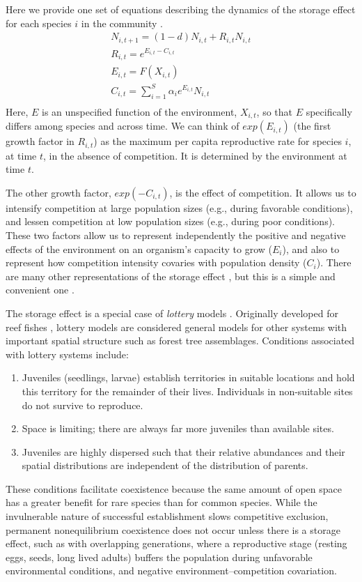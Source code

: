 Here we provide one set of equations describing the dynamics of the storage effect for each species $i$ in the community \cite{Chesson:1994pb}.
\begin{gather}
  \label{eq:storage}
  N_{i,t+1} = \left(1-d\right)N_{i,t} + R_{i,t}N_{i,t} \\
  R_{i,t} = e^{E_{i,t} - C_{i,t}} \\
  E_{i,t} = F\left( X_{i,t} \right)\\
  C_{i,t} = \sum_{i=1}^S\alpha_i e^{E_{i,t}}N_{i,t}\\
\end{gather}
Here, $E$ is an unspecified function of the environment, $X_{i,t}$, so that $E$ specifically differs among species and across time. We can think of $exp(E_{i,t})$ (the first growth factor in $R_{i,t}$) as the maximum per capita reproductive rate for species $i$, at time $t$, in the absence of competition. It is determined by the environment at time $t$. 

The other growth factor, $exp(-C_{i,t})$, is the effect of competition. It allows us to intensify competition at large population sizes (e.g., during favorable conditions), and lessen competition at low population sizes (e.g., during poor conditions). These two factors allow us to represent independently the positive and negative effects of the environment on an organism's capacity to grow ($E_i$), and also to represent how competition intensity covaries with population density ($C_i$). There are many other representations of the storage effect  \cite{Chesson2003,Warner1985}, but this is a simple and convenient one \cite{Chesson:1994pb}.

The storage effect is a special case of \emph{lottery} models \cite{Morin1999}. Originally developed for reef fishes \cite{Sale1977}, lottery models are considered general models for other systems with important spatial structure such as forest tree assemblages. Conditions associated with lottery systems \cite{Chesson1981} include:
\begin{enumerate}
\item Juveniles (seedlings, larvae) establish territories in suitable locations and hold this territory for the remainder of their lives. Individuals in non-suitable sites do not survive to reproduce.
\item Space is limiting; there are always far more juveniles than available sites.
\item Juveniles are highly dispersed such that their relative abundances and their spatial distributions are independent of the distribution of parents.
\end{enumerate}
These conditions facilitate coexistence because the same amount of open space has a greater benefit for rare species than for common species. While the invulnerable nature of successful establishment slows competitive exclusion, permanent nonequilibrium coexistence does not occur unless there is a storage effect, such as with overlapping generations, where a reproductive stage (resting eggs, seeds, long lived adults) buffers the population during unfavorable environmental conditions, and negative environment--competition covariation.

